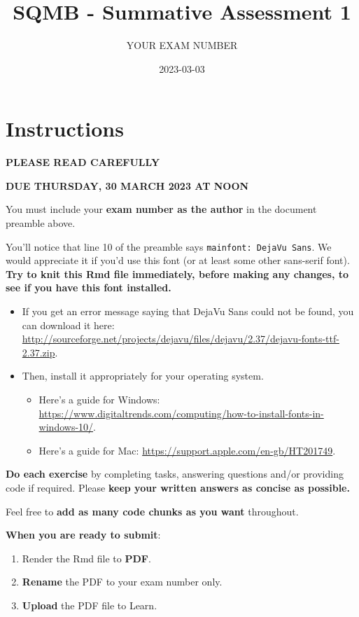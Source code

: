 \documentclass[
]{article}
\title{SQMB - Summative Assessment 1}
\author{YOUR EXAM NUMBER}
\date{2023-03-03}
\providecommand{\tightlist}{%
  \setlength{\itemsep}{0pt}\setlength{\parskip}{0pt}}
\begin{document}
\maketitle

\hypertarget{instructions}{%
\section{Instructions}\label{instructions}}

\textbf{PLEASE READ CAREFULLY}

\textbf{DUE THURSDAY, 30 MARCH 2023 AT NOON}

You must include your \textbf{exam number as the author} in the document
preamble above.

You'll notice that line 10 of the preamble says
\texttt{mainfont:\ DejaVu\ Sans}. We would appreciate it if you'd use
this font (or at least some other sans-serif font). \textbf{Try to knit
this Rmd file immediately, before making any changes, to see if you have
this font installed.}

\begin{itemize}
\tightlist
\item
  If you get an error message saying that DejaVu Sans could not be
  found, you can download it here:
  \url{http://sourceforge.net/projects/dejavu/files/dejavu/2.37/dejavu-fonts-ttf-2.37.zip}.
\item
  Then, install it appropriately for your operating system.

  \begin{itemize}
  \tightlist
  \item
    Here's a guide for Windows:
    \url{https://www.digitaltrends.com/computing/how-to-install-fonts-in-windows-10/}.
  \item
    Here's a guide for Mac:
    \url{https://support.apple.com/en-gb/HT201749}.
  \end{itemize}
\end{itemize}

\textbf{Do each exercise} by completing tasks, answering questions
and/or providing code if required. Please \textbf{keep your written
answers as concise as possible.}

Feel free to \textbf{add as many code chunks as you want} throughout.

\textbf{When you are ready to submit}:

\begin{enumerate}
\def\labelenumi{\arabic{enumi}.}
\tightlist
\item
  Render the Rmd file to \textbf{PDF}.
\item
  \textbf{Rename} the PDF to your exam number only.
\item
  \textbf{Upload} the PDF file to Learn.
\end{enumerate}
\end{document}
